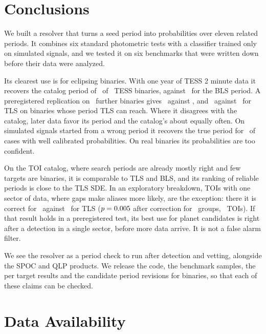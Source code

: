 \documentclass[twocolumn,linenumbers]{aastex701}
\begin{document}
\section{Conclusions} \label{sec:conclusions}

We built a resolver that turns a seed period into probabilities over eleven related periods. It combines six standard photometric tests with a classifier trained only on simulated signals, and we tested it on six benchmarks that were written down before their data were analyzed.

Its clearest use is for eclipsing binaries. With one year of TESS 2 minute data it recovers the catalog period of \bFiveAcc\ of \bFiveN\ TESS binaries, against \bFiveRawBls\ for the BLS period. A preregistered replication on \bSixN\ further binaries gives \bSixAcc\ against \bSixBls, and \bSixHtwoAcc\ against \bSixHtwoTls\ for TLS on binaries whose period TLS can reach. Where it disagrees with the catalog, later data favor its period and the catalog's about equally often. On simulated signals started from a wrong period it recovers the true period for \bOneWAcc\ of cases with well calibrated probabilities. On real binaries its probabilities are too confident.

On the TOI catalog, where search periods are already mostly right and few targets are binaries, it is comparable to TLS and BLS, and its ranking of reliable periods is close to the TLS SDE. In an exploratory breakdown, TOIs with one sector of data, where gaps make aliases more likely, are the exception: there it is correct for \bTwoOneSecAcc\ against \bTwoOneSecTls\ for TLS ($p=0.005$ after correction for \bTwoStrataN\ groups, \bTwoOneSecN\ TOIs). If that result holds in a preregistered test, its best use for planet candidates is right after a detection in a single sector, before more data arrive. It is not a false alarm filter.

We see the resolver as a period check to run after detection and vetting, alongside the SPOC and QLP products. We release the code, the benchmark samples, the per target results and the candidate period revisions for binaries, so that each of these claims can be checked.

\section*{Data Availability}
\end{document}

